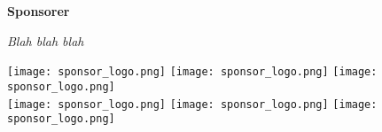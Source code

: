 \cleardoublepage
\begin{titlepage}
	\centering
	\vspace{3cm}
	{\Huge\sffamily\bfseries Sponsorer \par} \vspace{0.5cm}
	{\small\itshape Blah blah blah\par} \vspace{0.75cm}
	\vfill
	{
	\texttt{[image: sponsor\_logo.png]}\hfill
	\texttt{[image: sponsor\_logo.png]}\hfill
	\texttt{[image: sponsor\_logo.png]}\\
	\vspace{1cm}
	\texttt{[image: sponsor\_logo.png]}\hfill
	\texttt{[image: sponsor\_logo.png]}\hfill
	\texttt{[image: sponsor\_logo.png]}
	\par}\vspace{1.5cm}
\end{titlepage}